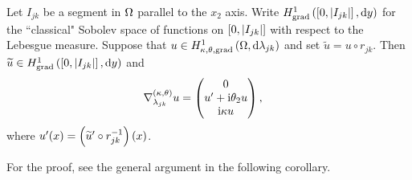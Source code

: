 \begin{prop} \label{prop:3DTangGradSegment}
	Let $I_{jk}$ be a segment in $\Omega$ parallel to the $x_2$ axis.
	Write $H^1_\mathrm{grad}\left( \left[ 0,\left\lvert I_{jk} \right\rvert \right], \mathrm{d}y \right)$ for the ``classical" Sobolev space of functions on $\left[ 0,\left\lvert I_{jk} \right\rvert \right]$ with respect to the Lebesgue measure.
	Suppose that $u\in H^1_{\kappa,\theta,\mathrm{grad}}\left( \Omega, \mathrm{d}\lambda_{jk} \right)$ and set $\widetilde{u} = u \circ r_{jk}$.
	Then $\widetilde{u}\in H^1_\mathrm{grad}\left( \left[ 0,\left\lvert I_{jk} \right\rvert \right], \mathrm{d}y \right)$ and
	\begin{align*}
		\nabla^{\left( \kappa, \theta \right)}_{\lambda_{jk}} u &= 
		\begin{pmatrix} 0 \\ u' + \mathrm{i}\theta_2 u \\ \mathrm{i}\kappa u \end{pmatrix},
	\end{align*}
	where $u'(x) = \left( \widetilde{u}'\circ r_{jk}^{-1} \right)(x)$.
\end{prop}
For the proof, see the general argument in the following corollary.
%	
